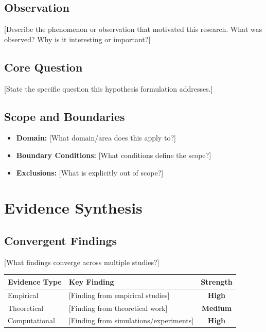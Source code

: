 \documentclass[11pt,a4paper]{article}
\newcommand{\scorehigh}{\textcolor{scoreHigh}{\textbf{High}}}
\newcommand{\scoremed}{\textcolor{scoreMed}{\textbf{Medium}}}
\begin{document}
\subsection*{Observation}
[Describe the phenomenon or observation that motivated this research. What was observed? Why is it interesting or important?]

\subsection*{Core Question}
[State the specific question this hypothesis formulation addresses.]

\subsection*{Scope and Boundaries}
\begin{itemize}
    \item \textbf{Domain:} [What domain/area does this apply to?]
    \item \textbf{Boundary Conditions:} [What conditions define the scope?]
    \item \textbf{Exclusions:} [What is explicitly out of scope?]
\end{itemize}

\section{Evidence Synthesis}

\subsection*{Convergent Findings}
[What findings converge across multiple studies?]

\begin{center}
\begin{tabularx}{\textwidth}{lXc}
\toprule
\textbf{Evidence Type} & \textbf{Key Finding} & \textbf{Strength} \\
\midrule
Empirical & [Finding from empirical studies] & \scorehigh \\
Theoretical & [Finding from theoretical work] & \scoremed \\
Computational & [Finding from simulations/experiments] & \scorehigh \\
\bottomrule
\end{tabularx}
\end{center}
\end{document}
